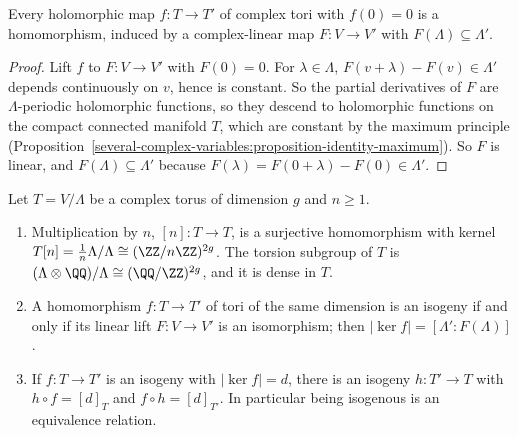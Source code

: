 \begin{lemma}\label{algebraic-groups:lemma-homomorphisms}
Every holomorphic map $f \colon T \to T'$ of complex tori with $f(0) = 0$ is a homomorphism, induced by a complex-linear map $F \colon V \to V'$ with $F(\Lambda) \subseteq \Lambda'$.
\end{lemma}

\begin{proof}
Lift $f$ to $F \colon V \to V'$ with $F(0) = 0$. For $\lambda \in \Lambda$, $F(v + \lambda) - F(v) \in \Lambda'$ depends continuously on $v$, hence is constant. So the partial derivatives
of $F$ are $\Lambda$-periodic holomorphic functions, so they descend to holomorphic functions on the compact connected manifold $T$, which are constant by the maximum principle
(Proposition~\ref{several-complex-variables:proposition-identity-maximum}). So $F$ is linear, and $F(\Lambda) \subseteq \Lambda'$ because $F(\lambda) = F(0 + \lambda) - F(0) \in \Lambda'$.
\end{proof}

\begin{proposition}\label{algebraic-groups:proposition-torsion}
Let $T = V/\Lambda$ be a complex torus of dimension $g$ and $n \geq 1$.
\begin{enumerate}
\item Multiplication by $n$, $[n] \colon T \to T$, is a surjective homomorphism with kernel $T[n] = \frac1n\Lambda/\Lambda \cong (\ZZ/n\ZZ)^{2g}$. The torsion subgroup of $T$ is $(\Lambda \otimes \QQ)/\Lambda \cong (\QQ/\ZZ)^{2g}$, and it is
dense in $T$.
\item A homomorphism $f \colon T \to T'$ of tori of the same dimension is an isogeny if and only if its linear lift $F \colon V \to V'$ is an isomorphism; then $|\ker f| = [\Lambda' : F(\Lambda)]$.
\item If $f \colon T \to T'$ is an isogeny with $|\ker f| = d$, there is an isogeny $h \colon T' \to T$ with $h \circ f = [d]_T$ and $f \circ h = [d]_{T'}$. In particular being isogenous is an equivalence relation.
\end{enumerate}
\end{proposition}

